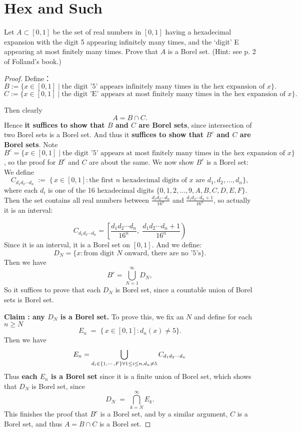 \documentclass[lang=cn,11pt]{elegantbook}
\begin{document}
\section{Hex and Such}
Let $A \subset [0,1]$ be the set of real numbers in $[0,1]$ having a hexadecimal expansion with the digit 5 appearing infinitely many times, and the ‘digit’ E appearing at most finitely many times. Prove that $A$ is a Borel set. (Hint: see p. 2 of Folland’s book.)
\begin{proof}
Define：
   \[
   B := \{ x \in [0,1] \mid \text{the digit '5' appears infinitely many times in the hex expansion of }x \}.
   \]\[
   C := \{ x \in [0,1] \mid \text{the digit 'E' appears at most finitely many times in the hex expansion of }x \}.
   \]

\noindent Then clearly
\[
A = B \cap C.
\]
\noindent Hence \textbf{it suffices to show that \(B\) and \(C\) are Borel sets}, since intersection of two Borel sets is a Borel set.
\noindent And thus it \textbf{suffices to show that $B^c$ and $C$ are Borel sets}. Note 
$$B^c = \{ x \in [0,1] \mid \text{the digit '5' appears at most finitely many times in the hex expansion of }x \}$$, so the proof for $B^c$ and $C$ are about the same.
\noindent We now show $B^c$ is a Borel set:
\noindent  We define
\[
     C_{d_1 d_2 \cdots d_n} \;:=\; \bigl\{\, x\in[0,1] : \text{the first }n\text{ hexadecimal digits of }x \text{ are }d_1, d_2, \ldots, d_n \bigr\},
   \]
where each \(d_i\) is one of the 16 hexadecimal digits \(\{0, 1, 2, \dots, 9, A, B, C, D, E, F\}\).  
 Then the set contains all real numbers between $\frac{d_1d_2\cdots d_n}{16^n}$ and $\frac{d_1d_2\cdots d_n + 1}{16^n}$, so actually it is an interval:

   \[
     C_{d_1 d_2 \cdots d_n} =   \left[\frac{d_1d_2\cdots d_n}{16^n},\;\frac{d_1d_2\cdots d_n + 1}{16^n}\right)
   \]
 Since it is an interval, it is a Borel set on \([0,1]\).
\noindent And we define:
\[
D_N = \{ x : \text{from digit \(N\) onward, there are no '5's} \}.
\]
Then we have
\[
B^c = \bigcup_{N=1}^{\infty} D_N,
\]
So it suffices to prove that each $D_N$ is Borel set, since a countable union of Borel sets is Borel set.

\noindent   \textbf{Claim : any $D_N$ is a Borel set.}
To prove this, we fix  an $N$ and define for each $n \geq N$
\[
     E_n 
     \;=\; 
     \{\,x \in [0,1]: d_n(x)\neq 5\}.
   \]
 \noindent  Then we have 
$$
E_n = \bigcup_{d_i \in \{1,\cdots,F\}   \forall 1\leq i \leq n, d_n \not = 5}  C_{d_1d_2\cdots d_n}
$$
 Thus \textbf{each $E_n$ is a Borel set} since it is a finite union of Borel set, which shows that $D_N$ is Borel set, since 
 \[
     D_N 
     \;=\;
     \bigcap_{k = N}^{\infty} E_k.
   \]
This finishes the proof that $B^c$ is a Borel set, and by a similar argument, $C$ is a Borel set, and thus $A = B \cap C$ is a Borel set. 
   
\end{proof}
\end{document}
